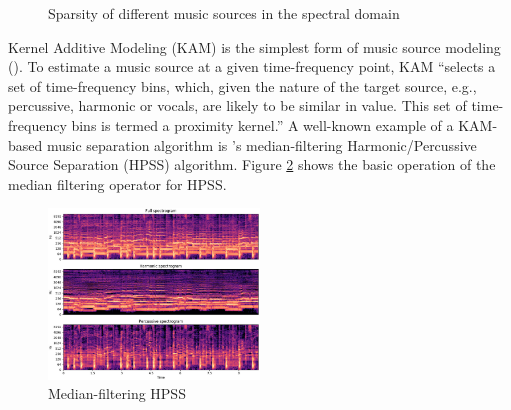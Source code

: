 \documentclass[report.tex]{subfiles}
\begin{document}
\begin{figure}[ht]
	\centering
	\caption{Sparsity of different music sources in the spectral domain}
\label{fig:sepgood}
\end{figure}

Kernel Additive Modeling (KAM) is the simplest form of music source modeling (\cite{musicsepgood}). To estimate a music source at a given time-frequency point, KAM ``selects a set of time-frequency bins, which, given the nature of the target source, e.g., percussive, harmonic or vocals, are likely to be similar in value. This set of time-frequency bins is termed a proximity kernel.'' A well-known example of a KAM-based music separation algorithm is \textcite{fitzgerald1}'s median-filtering Harmonic/Percussive Source Separation (HPSS) algorithm. Figure \ref{fig:fitzhpss} shows the basic operation of the median filtering operator for HPSS.

\begin{figure}[ht]
	\centering
	\includegraphics[width=0.5\textwidth]{./images-misc/hpss.png}
	\caption{Median-filtering HPSS}
	\label{fig:fitzhpss}
\end{figure}
\end{document}

